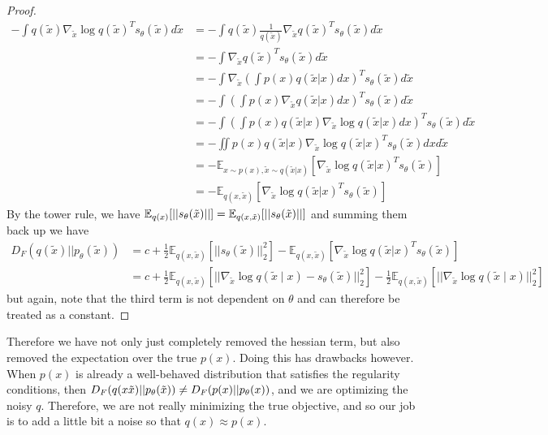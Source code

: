 \documentclass{article}
\begin{document}
\begin{proof}
      \begin{align}
        -\int q(\tilde{x})\nabla_{\tilde{x}} \log q(\tilde{x})^T s_\theta(\tilde{x}) d\tilde{x} & = -\int q(\tilde{x})\frac{1}{q(\tilde{x})}\nabla_{\tilde{x}}q(\tilde{x})^T s_\theta(\tilde{x}) d\tilde{x} \\
                                                                                                & = -\int \nabla_{\tilde{x}}q(\tilde{x})^T s_\theta(\tilde{x}) d\tilde{x} \\
        & = -\int \nabla_{\tilde{x}}\left(\int p(x)q(\tilde{x}|x) dx\right)^T s_\theta(\tilde{x}) d\tilde{x} \\
        & = -\int \left(\int p(x)\nabla_{\tilde{x}}q(\tilde{x}|x) dx\right)^T s_\theta(\tilde{x}) d\tilde{x} \\
        & = -\int \left(\int p(x)q(\tilde{x}|x)\nabla_{\tilde{x}} \log q(\tilde{x}|x) dx\right)^T s_\theta(\tilde{x}) d\tilde{x} \\
        & = -\iint p(x)q(\tilde{x}|x)\nabla_{\tilde{x}} \log q(\tilde{x}|x)^T s_\theta(\tilde{x}) dx d\tilde{x} \\
        & = -\mathbb{E}_{x\sim p(x),\tilde{x}\sim q(\tilde{x}|x)}\left[\nabla_{\tilde{x}} \log q(\tilde{x}|x)^T s_\theta(\tilde{x})\right] \\
        & = -\mathbb{E}_{q(x, \tilde{x})}\left[\nabla_{\tilde{x}} \log q(\tilde{x}|x)^T s_\theta(\tilde{x})\right] 
      \end{align} 
      By the tower rule, we have $\mathbb{E}_{q(x)} [ ||s_\theta (\Tilde{x})||] = \mathbb{E}_{q(x, \tilde{x})} [ ||s_\theta (\Tilde{x})||]$ and summing them back up we have 
      \begin{align}
        D_F (q(\tilde{x}) || p_\theta (\tilde{x})) & = c + \frac{1}{2} \mathbb{E}_{q(x, \tilde{x})} [||s_\theta (\tilde{x})||_2^2] - \mathbb{E}_{q(x, \tilde{x})}\left[\nabla_{\tilde{x}} \log q(\tilde{x}|x)^T s_\theta(\tilde{x})\right] \\
                                                   & = c + \frac{1}{2} \mathbb{E}_{q(x, \tilde{x})} [ || \nabla_{\tilde{x}} \log q(\tilde{x} \mid x) - s_\theta (\tilde{x})||_2^2 ] - \frac{1}{2} \mathbb{E}_{q(x, \tilde{x})} [ || \nabla_{\tilde{x}} \log q(\tilde{x} \mid x) ||_2^2 ]
      \end{align}
      but again, note that the third term is not dependent on $\theta$ and can therefore be treated as a constant. 
    \end{proof}

    Therefore we have not only just completely removed the hessian term, but also removed the expectation over the true $p(x)$. Doing this has drawbacks however. When $p(x)$ is already a well-behaved distribution that satisfies the regularity conditions, then $D_F (q(x\Tilde{x}) || p_\theta (\Tilde{x})) \neq D_F(p(x) || p_\theta (x))$, and we are optimizing the noisy $q$. Therefore, we are not really minimizing the true objective, and so our job is to add a little bit a noise so that $q(x) \approx p(x)$. 
\end{document}
